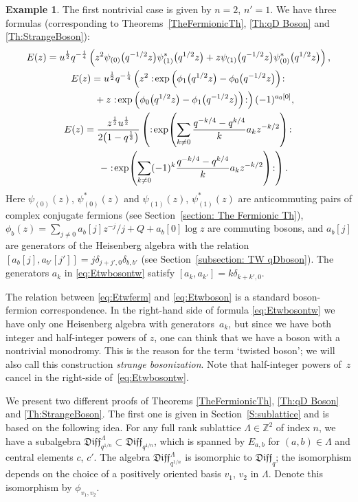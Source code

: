 \documentclass[pdftex]{sigma}
\numberwithin{equation}{section}
\theoremstyle{definition}
\newtheorem{Example}[Theorem]{Example}
\newcommand{\qd}[1]{ \mathfrak{Diff}_{q^{#1}} }
\newcommand{\qD}{\mathfrak{Diff}_q}
\begin{document}
\begin{Example}
The first nontrivial case is given by $n=2$, $n'=1$. We have three formulas (corresponding to Theorems~\ref{TheFermionicTh}, \ref{Th:qD Boson} and \ref{Th:StrangeBoson}):
\begin{gather}
E(z) = u^{\frac{1}{2}}q^{-\frac14} \left( z^2\psi_{(0)} \big( q^{-1/2} z\big) \psi_{(1)}^* \big(q^{1/2} z\big) + z\psi_{(1)} \big( q^{-1/2} z\big) \psi_{(0)}^* \big(q^{1/2} z\big) \right), \label{eq:Etwferm}
\\
E(z) = u^{\frac{1}{2}}q^{-\frac14}\left( z^2 :\!\exp \left( \phi_1\big(q^{1/2} z\big) - \phi_0\big(q^{-1/2} z\big) \right)\!: \right.\nonumber\\
\left. \hphantom{E(z) =}{} +z^{} :\!\exp \left( \phi_0\big(q^{1/2} z\big) - \phi_1\big(q^{-1/2} z\big) \right)\!: \right) (-1)^{a_{0}[0]},\label{eq:Etwboson} \\
E(z) = \frac{z^{\frac12} u^{\frac{1}{2}}}{2\big(1-q^{\frac12}\big)}\left( :\!\exp \! \left( \sum_{k\neq 0} \frac{q^{-k/4}-q^{k/4}}{k} a_{k} z^{-k/2} \right)\!: \right.\nonumber\\
\left.\hphantom{E(z) =}{} - :\!\exp\!\left( \sum_{k \neq 0} (-1)^{k}\frac{q^{-k/4}-q^{k/4}}{k} a_{k} z^{-k/2} \right)\!:\right). \label{eq:Etwbosontw}
\end{gather}
Here $\psi_{(0)}(z)$, $\psi_{(0)}^*(z)$ and $\psi_{(1)}(z)$, $\psi_{(1)}^*(z)$ are anticommuting pairs of complex conjugate fermions (see Section~\ref{section: The Fermionic Th}), $\phi_{b}(z)=\sum\limits_{j \neq 0} a_{b} [j] z^{-j}/j + Q + a_b[0] \log z$ are commuting bosons, and $a_{b}[j]$ are generators of the Heisenberg algebra with the relation $[a_{b}[j],a_{b'}[j']]=j\delta_{j+j',0}\delta_{b,b'}$ (see Section~\ref{subsection: TW qDboson}). The generators $a_k$ in \eqref{eq:Etwbosontw} satisfy $[a_k,a_{k'}]=k\delta_{k+k',0}$.

The relation between \eqref{eq:Etwferm} and \eqref{eq:Etwboson} is a standard boson-fermion correspondence. In the right-hand side of formula \eqref{eq:Etwbosontw} we have only one Heisenberg algebra with generators~$a_{k}$, but since we have both integer and half-integer powers of $z$, one can think that we have a boson with a nontrivial monodromy. This is the reason for the term `twisted boson'; we will also call this construction \emph{strange bosonization}. Note that half-integer powers of~$z$ cancel in the right-side of~\eqref{eq:Etwbosontw}.
\end{Example}

We present two different proofs of Theorems \ref{TheFermionicTh}, \ref{Th:qD Boson} and \ref{Th:StrangeBoson}. The first one is given in Section~\ref{S:sublattice} and is based on the following idea. For any
full rank sublattice $\Lambda\in \mathbb{Z}^2$ of index $n$, we have a subalgebra $\qd{1/n}^{\Lambda} \subset \qd{1/n}$, which is spanned by $E_{a,b}$ for $(a,b) \in \Lambda$ and central elements $c$, $c'$. The algebra $\qd{1/n}^{\Lambda}$ is isomorphic to $\qD$; the isomorphism depends on the choice of a positively oriented basis $v_1$, $v_2$ in $\Lambda$. Denote this isomorphism by $\phi_{v_1,v_2}$.
\end{document}
